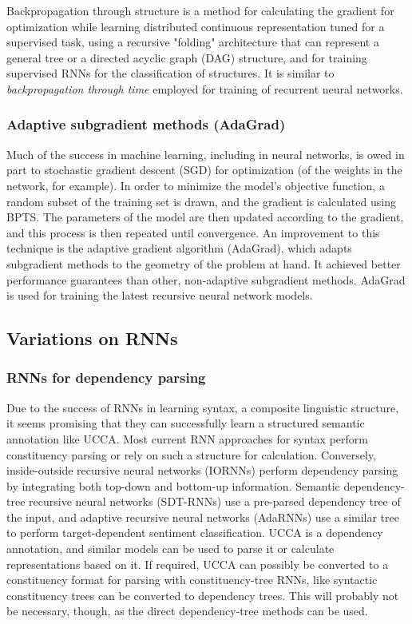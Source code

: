 \documentclass[11pt]{article}
\begin{document}
Backpropagation through structure is a method for calculating the gradient for optimization while learning distributed continuous representation tuned for a supervised task, using a recursive "folding" architecture that can represent a general tree or a directed acyclic graph (DAG) structure\cite{goller1996learning}, and for training supervised RNNs for the classification of structures. It is similar to \textit{backpropagation through time} employed for training of recurrent neural networks.


\subsubsection{Adaptive subgradient methods (AdaGrad)}

Much of the success in machine learning, including in neural networks, is owed in part to stochastic gradient descent (SGD) for optimization (of the weights in the network, for example). In order to minimize the model's objective function, a random subset of the training set is drawn, and the gradient is calculated using BPTS. The parameters of the model are then updated according to the gradient, and this process is then repeated until convergence. An improvement to this technique is the adaptive gradient algorithm (AdaGrad), which adapts subgradient methods to the geometry of the problem at hand. It achieved better performance guarantees than other, non-adaptive subgradient methods. AdaGrad is used for training the latest recursive neural network models\cite{socher2013recursive}.



\subsection{Variations on RNNs}

\subsubsection{RNNs for dependency parsing}

Due to the success of RNNs in learning syntax, a composite linguistic structure, it seems promising that they can successfully learn a structured semantic annotation like UCCA. Most current RNN approaches for syntax perform constituency parsing or rely on such a structure for calculation\cite{socher2013parsing}. Conversely, inside-outside recursive neural networks (IORNNs) perform dependency parsing by integrating both top-down and bottom-up information\cite{le2014inside}. Semantic dependency-tree recursive neural networks (SDT-RNNs) use a pre-parsed dependency tree of the input\cite{socher2013grounded}, and adaptive recursive neural networks (AdaRNNs) use a similar tree to perform target-dependent sentiment classification\cite{dong2014adaptive}. UCCA is a dependency annotation, and similar models can be used to parse it or calculate representations based on it. If required, UCCA can possibly be converted to a constituency format for parsing with constituency-tree RNNs, like syntactic constituency trees can be converted to dependency trees\cite{mcdonald2013universal}. This will probably not be necessary, though, as the direct dependency-tree methods can be used.
\end{document}
